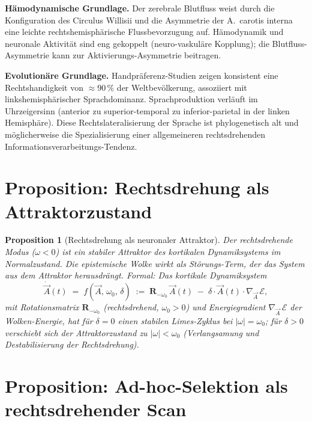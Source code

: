 ﻿\documentclass[12pt,a4paper]{report}
\theoremstyle{plain}
\newtheorem{proposition}[theorem]{Proposition}
\theoremstyle{definition}
\theoremstyle{remark}
\begin{document}
	\textbf{Hämodynamische Grundlage.}
	Der zerebrale Blutfluss weist durch die Konfiguration des Circulus
	Willisii und die Asymmetrie der A.\ carotis interna eine leichte
	rechtshemisphärische Flussbevorzugung auf. Hämodynamik und
	neuronale Aktivität sind eng gekoppelt (neuro-vaskuläre Kopplung);
	die Blutfluss-Asymmetrie kann zur Aktivierungs-Asymmetrie beitragen.
	
	\textbf{Evolutionäre Grundlage.}
	Handpräferenz-Studien zeigen konsistent eine Rechtshandigkeit von
	$\approx 90\,\%$ der Weltbevölkerung, assoziiert mit linkshemisphärischer
	Sprachdominanz. Sprachproduktion verläuft im Uhrzeigersinn (anterior
	zu superior-temporal zu inferior-parietal in der linken Hemisphäre).
	Diese Rechtslateralisierung der Sprache ist phylogenetisch alt und
	möglicherweise die Spezialisierung einer allgemeineren rechtsdrehenden
	Informationsverarbeitungs-Tendenz.
	
	\section{Proposition: Rechtsdrehung als Attraktorzustand}
	
	\begin{proposition}[Rechtsdrehung als neuronaler Attraktor]
		\label{prop:attraktor}
		Der rechtsdrehende Modus ($\omega < 0$) ist ein stabiler Attraktor
		des kortikalen Dynamiksystems im Normalzustand.
		Die epistemische Wolke wirkt als Störungs-Term, der das System
		aus dem Attraktor herausdrängt.
		Formal: Das kortikale Dynamiksystem
		\[
		\dot{\vec{A}}(t) \;=\; f(\vec{A},\, \omega_0,\, \delta)
		\;:=\;
		\mathbf{R}_{-\omega_0}\,\vec{A}(t)
		\;-\; \delta \cdot \vec{A}(t) \cdot \nabla_{\vec{A}}\,\mathcal{E},
		\]
		mit Rotationsmatrix $\mathbf{R}_{-\omega_0}$ (rechtsdrehend,
		$\omega_0 > 0$) und Energiegradient $\nabla_{\vec{A}}\,\mathcal{E}$
		der Wolken-Energie, hat für $\delta = 0$ einen stabilen
		Limes-Zyklus bei $|\omega| = \omega_0$; für $\delta > 0$
		verschiebt sich der Attraktorzustand zu $|\omega| < \omega_0$
		(Verlangsamung und Destabilisierung der Rechtsdrehung).
	\end{proposition}
	
	\section{Proposition: Ad-hoc-Selektion als rechtsdrehender Scan}
	
\end{document}
